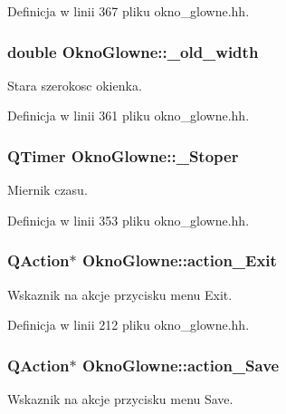 Definicja w linii 367 pliku okno\-\_\-glowne.\-hh.

\hypertarget{class_okno_glowne_a6a0922607c0970ecdfe8adec7a773c7f}{
\subsubsection[{\-\_\-old\-\_\-width}]{\setlength{\rightskip}{0pt plus 5cm}double Okno\-Glowne\-::\-\_\-old\-\_\-width\hspace{0.3cm}{\ttfamily [private]}}}\label{class_okno_glowne_a6a0922607c0970ecdfe8adec7a773c7f}
Stara szerokosc okienka. 

Definicja w linii 361 pliku okno\-\_\-glowne.\-hh.

\hypertarget{class_okno_glowne_a5d047f90666212f58e69d11af3285d9b}{
\subsubsection[{\-\_\-\-Stoper}]{\setlength{\rightskip}{0pt plus 5cm}Q\-Timer Okno\-Glowne\-::\-\_\-\-Stoper}}\label{class_okno_glowne_a5d047f90666212f58e69d11af3285d9b}
Miernik czasu. 

Definicja w linii 353 pliku okno\-\_\-glowne.\-hh.

\hypertarget{class_okno_glowne_a579ef9901f57057368cb522ea5a9a5c3}{
\subsubsection[{action\-\_\-\-Exit}]{\setlength{\rightskip}{0pt plus 5cm}Q\-Action$\ast$ Okno\-Glowne\-::action\-\_\-\-Exit\hspace{0.3cm}{\ttfamily [private]}}}\label{class_okno_glowne_a579ef9901f57057368cb522ea5a9a5c3}
Wskaznik na akcje przycisku menu Exit. 

Definicja w linii 212 pliku okno\-\_\-glowne.\-hh.

\hypertarget{class_okno_glowne_a2c2d825b6e5e0faa5eb368be4fc73b78}{
\subsubsection[{action\-\_\-\-Save}]{\setlength{\rightskip}{0pt plus 5cm}Q\-Action$\ast$ Okno\-Glowne\-::action\-\_\-\-Save\hspace{0.3cm}{\ttfamily [private]}}}\label{class_okno_glowne_a2c2d825b6e5e0faa5eb368be4fc73b78}
Wskaznik na akcje przycisku menu Save. 

